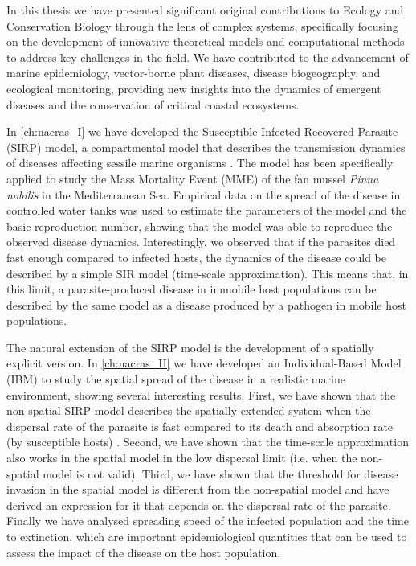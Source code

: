 
In this thesis we have presented significant original contributions to Ecology
and Conservation Biology through the lens of complex systems, specifically
focusing on the development of innovative theoretical models and computational
methods to address key challenges in the field. We have contributed to the
advancement of marine epidemiology, vector-borne plant diseases, disease
biogeography, and ecological monitoring, providing new insights into the
dynamics of emergent diseases and the conservation of critical coastal
ecosystems.


In \cref{ch:nacras_I} we have developed the
Susceptible-Infected-Recovered-Parasite (SIRP) model, a compartmental model
that describes the transmission dynamics of diseases affecting sessile marine
organisms \cite{GimenezRomero2021}. The model has been specifically applied to
study the Mass Mortality Event (MME) of the fan mussel \textit{Pinna nobilis}
in the Mediterranean Sea. Empirical data on the spread of the disease in
controlled water tanks was used to estimate the parameters of the model and the
basic reproduction number, showing that the model was able to reproduce the
observed disease dynamics. Interestingly, we observed that if the parasites
died fast enough compared to infected hosts, the dynamics of the disease could
be described by a simple SIR model (time-scale approximation). This means that,
in this limit, a parasite-produced disease in immobile host populations can be
described by the same model as a disease produced by a pathogen in mobile host
populations.

The natural extension of the SIRP model is the development of a spatially
explicit version. In \cref{ch:nacras_II} we have developed an Individual-Based
Model (IBM) to study the spatial spread of the disease in a realistic marine
environment, showing several interesting results. First, we have shown that the
non-spatial SIRP model describes the spatially extended system when the
dispersal rate of the parasite is fast compared to its death and absorption
rate (by susceptible hosts) \cite{GimenezRomero_2022_RSos}. Second, we have
shown that the time-scale approximation also works in the spatial model in the
low dispersal limit (i.e. when the non-spatial model is not valid). Third, we
have shown that the threshold for disease invasion in the spatial model is
different from the non-spatial model and have derived an expression for it that
depends on the dispersal rate of the parasite. Finally we have analysed
spreading speed of the infected population and the time to extinction, which
are important epidemiological quantities that can be used to assess the impact
of the disease on the host population.

